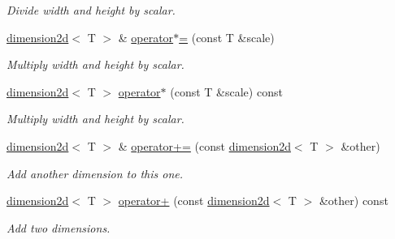 \begin{DoxyCompactItemize}
\begin{DoxyCompactList}\small\item\em Divide width and height by scalar. \end{DoxyCompactList}\item 
\mbox{\label{classirr_1_1core_1_1dimension2d_acd311b8270b3c95791edf9a5b2869b1b}} 
\hyperlink{classirr_1_1core_1_1dimension2d}{dimension2d}$<$ T $>$ \& \hyperlink{classirr_1_1core_1_1dimension2d_acd311b8270b3c95791edf9a5b2869b1b}{operator$\ast$=} (const T \&scale)
\begin{DoxyCompactList}\small\item\em Multiply width and height by scalar. \end{DoxyCompactList}\item 
\mbox{\label{classirr_1_1core_1_1dimension2d_a93c0e2bc5492325febfe9b5703bfc75d}} 
\hyperlink{classirr_1_1core_1_1dimension2d}{dimension2d}$<$ T $>$ \hyperlink{classirr_1_1core_1_1dimension2d_a93c0e2bc5492325febfe9b5703bfc75d}{operator$\ast$} (const T \&scale) const
\begin{DoxyCompactList}\small\item\em Multiply width and height by scalar. \end{DoxyCompactList}\item 
\mbox{\label{classirr_1_1core_1_1dimension2d_ae233386e59e95f213367922f7638bc46}} 
\hyperlink{classirr_1_1core_1_1dimension2d}{dimension2d}$<$ T $>$ \& \hyperlink{classirr_1_1core_1_1dimension2d_ae233386e59e95f213367922f7638bc46}{operator+=} (const \hyperlink{classirr_1_1core_1_1dimension2d}{dimension2d}$<$ T $>$ \&other)
\begin{DoxyCompactList}\small\item\em Add another dimension to this one. \end{DoxyCompactList}\item 
\mbox{\label{classirr_1_1core_1_1dimension2d_a128002f9610d1647fd8617ab7187e9a9}} 
\hyperlink{classirr_1_1core_1_1dimension2d}{dimension2d}$<$ T $>$ \hyperlink{classirr_1_1core_1_1dimension2d_a128002f9610d1647fd8617ab7187e9a9}{operator+} (const \hyperlink{classirr_1_1core_1_1dimension2d}{dimension2d}$<$ T $>$ \&other) const
\begin{DoxyCompactList}\small\item\em Add two dimensions. \end{DoxyCompactList}\item 

\end{DoxyCompactItemize}
